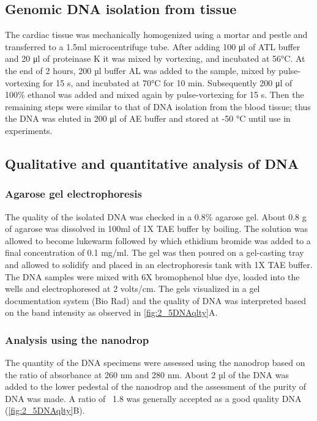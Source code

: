 \begin{refsection}
\subsection{Genomic DNA isolation from tissue}
The cardiac tissue was mechanically homogenized using a mortar and pestle and transferred to a 1.5ml microcentrifuge tube. After adding 100 μl of ATL buffer and 20 μl of proteinase K it was mixed by vortexing, and incubated at 56°C. At the end of 2 hours, 200 µl buffer AL was added to the sample, mixed by pulse-vortexing for 15 s, and incubated at 70°C for 10 min. Subsequently 200 μl of 100\% ethanol was added and mixed again by pulse-vortexing for 15 s. Then the remaining steps were similar to that of DNA isolation from the blood tissue; thus the DNA was eluted in 200 μl of AE buffer and stored at -50 °C until use in experiments. 
\subsection{Qualitative and quantitative analysis of DNA}
\subsubsection{Agarose gel electrophoresis}
The quality of the isolated DNA was checked in a 0.8\% agarose gel. About 0.8 g of agarose was dissolved in 100ml of 1X TAE buffer by boiling. The solution was allowed to become lukewarm followed by which ethidium bromide was added to a final concentration of 0.1 mg/ml. The gel was then poured on a gel-casting tray and allowed to solidify and placed in an electrophoresis tank with 1X TAE buffer. The DNA samples were mixed with 6X bromophenol blue dye, loaded into the wells and electrophoresed at 2 volts/cm. The gels visualized in a gel documentation system (Bio Rad) and the quality of DNA was interpreted based on the band intensity as observed in \cref{fig:2_5DNAqlty}A.
\subsubsection{Analysis using the nanodrop} 
The quantity of the DNA specimens were assessed using the nanodrop based on the ratio of absorbance at 260 nm and 280 nm. About 2 µl of the DNA was added to the lower pedestal of the nanodrop and the assessment of the purity of DNA was made. A ratio of ~1.8 was generally accepted as a good quality DNA (\cref{fig:2_5DNAqlty}B).


\end{refsection}
